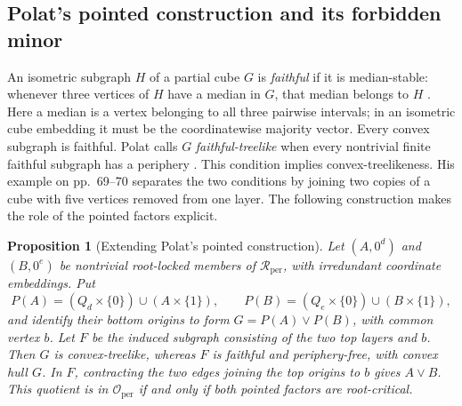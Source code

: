 \documentclass[11pt]{article}
\newtheorem{proposition}[theorem]{Proposition}
\theoremstyle{definition}
\theoremstyle{remark}
\newcommand{\Rper}{\mathcal R_{\mathrm{per}}}
\newcommand{\Oper}{\mathcal O_{\mathrm{per}}}
\begin{document}
\subsection{Polat's pointed construction and its forbidden minor}
\label{sec:polat-construction}

An isometric subgraph \(H\) of a partial cube \(G\) is \emph{faithful}
if it is median-stable: whenever three vertices of \(H\) have a median in
\(G\), that median belongs to \(H\) \cite[p.~66]{Polat12treelike}.
Here a median is a vertex belonging to all three pairwise intervals; in an
isometric cube embedding it must be the coordinatewise majority vector.
Every convex subgraph is faithful. Polat calls \(G\)
\emph{faithful-treelike} when every nontrivial finite faithful subgraph has
a periphery \cite[Definition~5.5]{Polat12treelike}. This condition implies
convex-treelikeness. His example on pp.~69--70 separates the two conditions
by joining two copies of a cube with five vertices removed from one layer.
The following construction makes the role of the pointed factors explicit.

\begin{proposition}[Extending Polat's pointed construction]
\label{prop:polat-construction}
Let \((A,0^d)\) and \((B,0^e)\) be nontrivial root-locked members of
\(\Rper\), with irredundant coordinate embeddings. Put
\[
 P(A)=(Q_d\times\{0\})\cup(A\times\{1\}),\qquad
 P(B)=(Q_e\times\{0\})\cup(B\times\{1\}),
\]
and identify their bottom origins to form \(G=P(A)\vee P(B)\), with
common vertex \(b\). Let \(F\) be the induced subgraph consisting of the
two top layers and \(b\). Then \(G\) is convex-treelike, whereas \(F\)
is faithful and periphery-free, with convex hull \(G\).
In \(F\), contracting the two edges joining the top origins to \(b\) gives
\(A\vee B\). This quotient is in \(\Oper\) if and only if both pointed
factors are root-critical.
\end{proposition}
\end{document}
